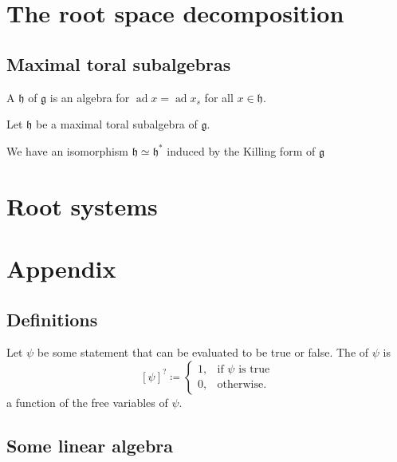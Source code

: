 \documentclass{article}
\DeclareMathOperator{\ad}{ad}
\newcommand*\frkg{{\ensuremath{\mathfrak{g}}}}
\newcommand*\frkh{{\ensuremath{\mathfrak{h}}}}
\begin{document}
\section{The root space decomposition}

\subsection{Maximal toral subalgebras}

\begin{definition}
    A  $\frkh$ of $\frkg$ is an algebra for $\ad x = \ad x_s$ for all $x \in \frkh$.
\end{definition}

\begin{proposition}
    Let $\frkh$ be a maximal toral subalgebra of $\frkg$.

    We have an isomorphism $\frkh \simeq \frkh^\ast$ induced by the Killing form of $\frkg$
\end{proposition}

\section{Root systems}

\begin{definition}
\end{definition}

\section{Appendix}

\subsection{Definitions}

\begin{definition}
    \label{def:Iverson}
    Let $\psi$ be some statement that can be evaluated to be true or false.
    The  of $\psi$ is
    \[
        [\psi]^? \coloneq \begin{cases}
            1, & \text{if }\psi\text{ is true} \\
            0, & \text{otherwise}.
        \end{cases}
    \]
    a function of the free variables of $\psi$.
\end{definition}

\subsection{Some linear algebra}
\end{document}
